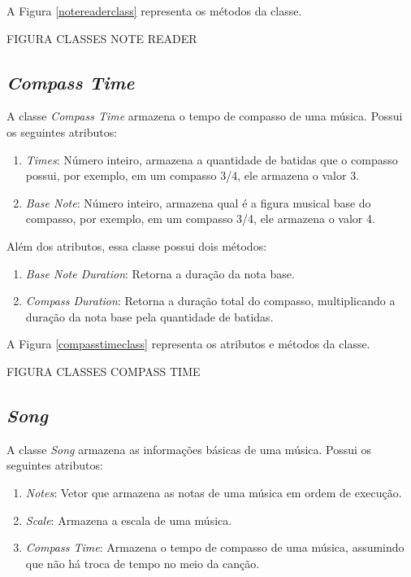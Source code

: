       A Figura \ref{notereaderclass} representa os métodos da classe.

      FIGURA CLASSES NOTE READER

    \subsection[\textit{Compass Time}]{\textit{Compass Time}}

      A classe \textit{Compass Time} armazena o tempo de compasso de uma música. Possui os seguintes atributos:

      \begin{enumerate}
        \item \textit{Times}: Número inteiro, armazena a quantidade de batidas que o compasso possui, por exemplo, em um compasso 3/4, ele armazena o valor 3.
        \item \textit{Base Note}: Número inteiro, armazena qual é a figura musical base do compasso, por exemplo, em um compasso 3/4, ele armazena o valor 4.
      \end{enumerate}

      Além dos atributos, essa classe possui dois métodos:

      \begin{enumerate}
        \item \textit{Base Note Duration}: Retorna a duração da nota base.
        \item \textit{Compass Duration}: Retorna a duração total do compasso, multiplicando a duração da nota base pela quantidade de batidas.
      \end{enumerate}


      A Figura \ref{compasstimeclass} representa os atributos e métodos da classe.

      FIGURA CLASSES COMPASS TIME

    \subsection[\textit{Song}]{\textit{Song}}

      A classe \textit{Song} armazena as informações básicas de uma música. Possui os seguintes atributos:

      \begin{enumerate}
        \item \textit{Notes}: Vetor que armazena as notas de uma música em ordem de execução.
        \item \textit{Scale}: Armazena a escala de uma música.
        \item \textit{Compass Time}: Armazena o tempo de compasso de uma música, assumindo que não há troca de tempo no meio da canção.
      \end{enumerate}

